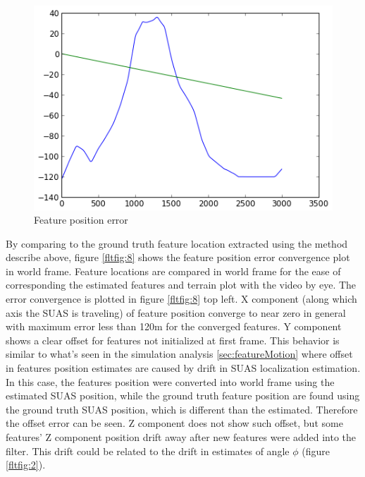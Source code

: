 \begin{figure}[h]
\centering
\includegraphics[width=12cm, keepaspectratio=true]
{./Figures/fltfig/cut1/intersect0_0.png}
\caption{Feature position error}
\label{fltfig:7}
\end{figure}

By comparing to the ground truth feature location extracted using the
method describe above, figure \ref{fltfig:8} shows the feature
position error convergence plot in world frame. Feature locations are
compared in world frame for the ease of corresponding the estimated
features and terrain plot with the video by eye. The error convergence
is plotted in figure \ref{fltfig:8} top left. X component (along which
axis the SUAS is traveling) of feature position converge to near zero
in general with maximum error less than 120m for the converged
features. Y component shows a clear offset for features not
initialized at first frame. This behavior is similar to what's seen in
the simulation analysis \ref{sec:featureMotion} where offset in features
position estimates are caused by drift in SUAS localization
estimation. In this case, the features position were converted into
world frame using the estimated SUAS position, while the ground
truth feature position are found using the ground truth SUAS position,
which is different than the estimated. Therefore the offset error can
be seen. Z component does not show such offset, but some features' Z
component position drift away after new features were added into the
filter. This drift could be related to the drift in estimates of angle
$\phi$ (figure \ref{fltfig:2}).

